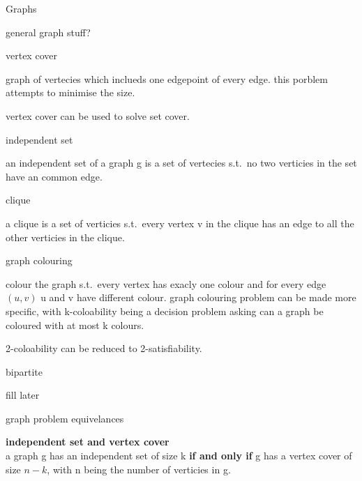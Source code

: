 \documentclass[12pt, letterpaper]{article}
\begin{document}
\begin{section}{Graphs}

  \begin{subsection}{general graph stuff?}

    \begin{subsubsection}{vertex cover}

      graph of vertecies which inclueds one edgepoint of every edge. this porblem
      attempts to minimise the size.

      vertex cover can be used to solve set cover.

    \end{subsubsection}

    \begin{subsubsection}{independent set}

      an independent set of a graph g is a set of vertecies s.t.\ no two
      verticies in the set have an common edge.

    \end{subsubsection}

    \begin{subsubsection}{clique}

      a clique is a set of verticies s.t.\ every vertex v in the clique
      has an edge to all the other verticies in the clique.

    \end{subsubsection}

    \begin{subsubsection}{graph colouring}

      colour the graph s.t.\ every vertex has exacly one colour and
      for every edge \((u, v)\) u and v have different colour. graph colouring
      problem can be made more specific, with k-coloability being a decision
      problem asking can a graph be coloured with at most k colours.

      2-coloability can be reduced to 2-satisfiability.

    \end{subsubsection}

    \begin{subsubsection}{bipartite}

      fill later

    \end{subsubsection}

    \begin{subsubsection}{graph problem equivelances}

      \textbf{independent set and vertex cover} \\
      a graph g has an independent set of size k \textbf{if and only if}
      g has a vertex cover of size \(n - k\), with n being the number of
      verticies in g.


\end{subsubsection}
\end{subsection}
\end{section}
\end{document}
